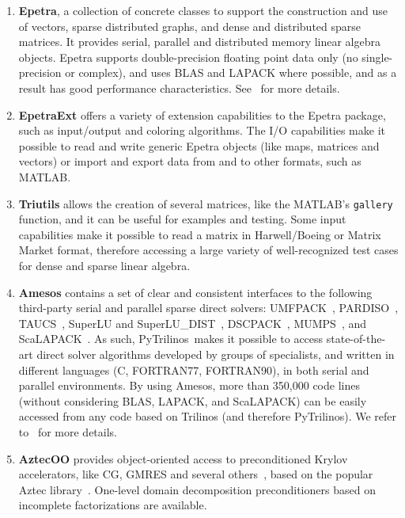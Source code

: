 \documentclass[acmtocl]{acmtrans2m}
\newcommand{\PyTrilinos}{{PyTrilinos}}
\begin{document}
\begin{enumerate}

\item {\bf Epetra}, a collection of concrete classes to support the
  construction and use of vectors, sparse distributed graphs, and
  dense and distributed sparse matrices.  It provides serial, parallel
  and distributed memory linear algebra objects.  Epetra supports
  double-precision floating point data only (no single-precision or
  complex), and uses BLAS and LAPACK where possible, and as a result
  has good performance characteristics.  See~\cite{epetra-guide} for
  more details.

\item {\bf EpetraExt} offers a variety of extension capabilities to
  the Epetra package, such as input/output and coloring algorithms.
  The I/O capabilities make it possible to read and write generic
  Epetra objects (like maps, matrices and vectors) or import and
  export data from and to other formats, such as MATLAB.

\item {\bf Triutils} allows the creation of several matrices, like the
  MATLAB's {\tt gallery} function, and it can be useful for examples
  and testing.  Some input capabilities make it possible to read a
  matrix in Harwell/Boeing or Matrix Market format, therefore
  accessing a large variety of well-recognized test cases for dense
  and sparse linear algebra.

\item {\bf Amesos} contains a set of clear and consistent interfaces
  to the following third-party serial and parallel sparse direct
  solvers: UMFPACK~\cite{umfpack-acm-toms},
  PARDISO~\cite{oskl:04-etna,sg:04-fgcs},
  TAUCS~\cite{rozin04locality,rotkin04design,irony04parallel}, SuperLU
  and SuperLU\_DIST~\cite{superlu-manual},
  DSCPACK~\cite{dscpack-manual}, MUMPS~\cite{mumps-manual}, and
  ScaLAPACK~\cite{scalapack-book,scalapack}.  As such,
  \PyTrilinos\ makes it possible to access state-of-the-art direct
  solver algorithms developed by groups of specialists, and written in
  different languages (C, FORTRAN77, FORTRAN90), in both serial and
  parallel environments.  By using Amesos, more than 350,000 code
  lines (without considering BLAS, LAPACK, and ScaLAPACK) can be
  easily accessed from any code based on Trilinos (and therefore
  \PyTrilinos).  We refer
  to~\cite{Amesos-Reference-Guide,Amesos-Design} for more details.

\item {\bf AztecOO} provides object-oriented access to preconditioned
  Krylov accelerators, like CG, GMRES and several
  others~\cite{golub96matrix}, based on the popular Aztec
  library~\cite{aztecoo-guide}.  One-level domain decomposition
  preconditioners based on incomplete factorizations are available.


\end{enumerate}
\end{document}
